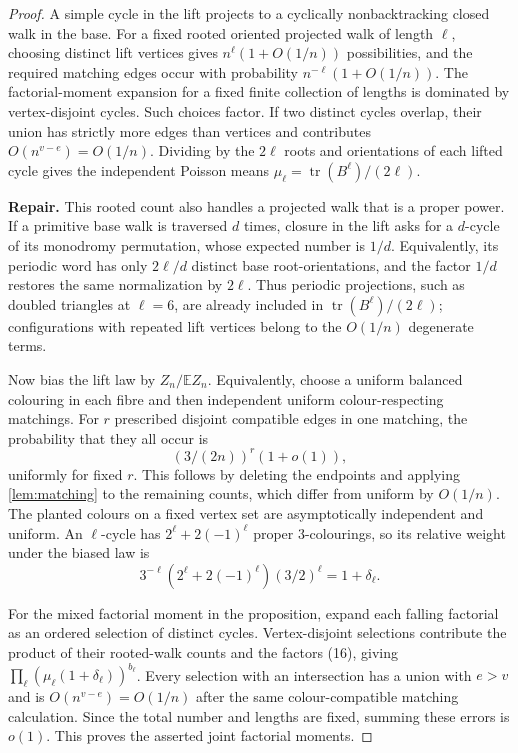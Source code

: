 \documentclass[11pt,a4paper]{article}
\theoremstyle{plain}
\theoremstyle{definition}
\theoremstyle{remark}
\newcommand{\E}{\mathbb E}
\newcommand{\tr}{\operatorname{tr}}
\newcommand{\repair}[1]{\begin{tcolorbox}[colback=yellow!7,colframe=gray!60,boxrule=0.3pt,arc=1pt,left=5pt,right=5pt,top=3pt,bottom=3pt]\small\textbf{Repair.} #1\end{tcolorbox}}
\begin{document}
\label{pf:cycles}
\propcycles*
\begin{proof}
A simple cycle in the lift projects to a cyclically nonbacktracking closed walk in the
base.  For a fixed rooted oriented projected walk of length $\ell$, choosing distinct
lift vertices gives $n^\ell(1+O(1/n))$ possibilities, and the required matching edges
occur with probability $n^{-\ell}(1+O(1/n))$.  The factorial-moment expansion for a
fixed finite collection of lengths is dominated by vertex-disjoint cycles.  Such
choices factor.  If two distinct cycles overlap, their union has strictly more edges
than vertices and contributes $O(n^{v-e})=O(1/n)$.  Dividing by the $2\ell$ roots and
orientations of each lifted cycle gives the independent Poisson means
$\mu_\ell=\tr(B^\ell)/(2\ell)$.

\repair{This rooted count also handles a projected walk that is a proper power.  If a
primitive base walk is traversed $d$ times, closure in the lift asks for a $d$-cycle of
its monodromy permutation, whose expected number is $1/d$.  Equivalently, its periodic
word has only $2\ell/d$ distinct base root-orientations, and the factor $1/d$ restores
the same normalization by $2\ell$.  Thus periodic projections, such as doubled
triangles at $\ell=6$, are already included in $\tr(B^\ell)/(2\ell)$; configurations
with repeated lift vertices belong to the $O(1/n)$ degenerate terms.}

Now bias the lift law by $Z_n/\E Z_n$.  Equivalently, choose a uniform balanced
colouring in each fibre and then independent uniform colour-respecting matchings.  For
$r$ prescribed disjoint compatible edges in one matching, the probability that they
all occur is
\[
 (3/(2n))^r(1+o(1)),                                           \tag{15}
\]
uniformly for fixed $r$.  This follows by deleting the endpoints and applying
\cref{lem:matching} to the remaining counts, which differ from uniform by $O(1/n)$.
The planted colours on a fixed vertex set are asymptotically independent and uniform.
An $\ell$-cycle has $2^\ell+2(-1)^\ell$ proper $3$-colourings, so its relative weight
under the biased law is
\[
 3^{-\ell}(2^\ell+2(-1)^\ell)(3/2)^\ell=1+\delta_\ell.          \tag{16}
\]

For the mixed factorial moment in the proposition, expand each falling factorial as an
ordered selection of distinct cycles.  Vertex-disjoint selections contribute the
product of their rooted-walk counts and the factors (16), giving
$\prod_\ell(\mu_\ell(1+\delta_\ell))^{b_\ell}$.  Every selection with an intersection
has a union with $e>v$ and is $O(n^{v-e})=O(1/n)$ after the same colour-compatible
matching calculation.  Since the total number and lengths are fixed, summing these
errors is $o(1)$.  This proves the asserted joint factorial moments.


\end{proof}
\end{document}
